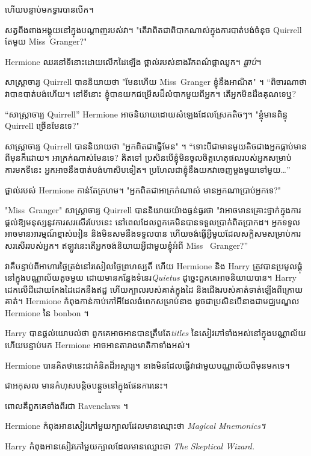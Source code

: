 ហើយបន្ទាប់មកទ្វារបានបើក។

សត្វពីងពាងអង្គុយនៅក្នុងបណ្តាញរបស់វា។ "តើវាពិតជាពិបាកណាស់ក្នុងការបាត់បង់ចំនុច Quirrell តែមួយ Miss~Granger?"

Hermione ឈរនៅទីនោះដោយលើកដៃឡើង ថ្ពាល់របស់នាងរីកពណ៌ផ្កាឈូក។ \emph{ធ្លាប់}។

សាស្រ្តាចារ្យ Quirrell បាននិយាយថា "មែនហើយ Miss~Granger ខ្ញុំនឹងអាណិត" ។ “ពិចារណា​ថា​វា​បាន​បាត់​បង់​ហើយ។ នៅទីនោះ ខ្ញុំបានយកជម្រើសដ៏លំបាកមួយពីអ្នក។ តើអ្នកមិនដឹងគុណទេឬ?

“សាស្រ្តាចារ្យ Quirrell” Hermione អាចនិយាយដោយសំឡេងដែលស្រែកតិចៗ។ "ខ្ញុំមានពិន្ទុ Quirrell ច្រើនមែនទេ?"

សាស្រ្តាចារ្យ Quirrell បាននិយាយថា "អ្នកពិតជាធ្វើមែន" ។ “ទោះបីជាមានមួយតិចជាងអ្នកធ្លាប់មានពីមុនក៏ដោយ។ អាក្រក់ណាស់មែនទេ? គិតទៅ ប្រសិនបើខ្ញុំមិនចូលចិត្តហេតុផលរបស់អ្នកសម្រាប់ការមកទីនេះ អ្នកអាចនឹងបាត់បង់ហាសិបទៀត។ ប្រហែល​ជា​ខ្ញុំ​នឹង​យក​វា​ចេញ​ម្តង​មួយ​ទៅ​មួយ…”

ថ្ពាល់របស់ Hermione កាន់តែក្រហម។ "អ្នកពិតជាអាក្រក់ណាស់ មានអ្នកណាប្រាប់អ្នកទេ?"

"Miss~Granger" សាស្ត្រាចារ្យ Quirrell បាននិយាយយ៉ាងធ្ងន់ធ្ងរថា "វាអាចមានគ្រោះថ្នាក់ក្នុងការផ្តល់ឱ្យមនុស្សនូវការសរសើរបែបនេះ នៅពេលដែលពួកគេមិនបានទទួលប្រាក់ពិតប្រាកដ។ អ្នកទទួលអាចមានអារម្មណ៍ខ្មាស់អៀន និងមិនសមនឹងទទួលបាន ហើយចង់ធ្វើអ្វីមួយដែលសក្តិសមសម្រាប់ការសរសើររបស់អ្នក។ ឥឡូវ​នេះ​តើ​អ្នក​ចង់​និយាយ​អ្វី​ជាមួយ​ខ្ញុំ​អំពី Miss ~Granger?”

\later

វាគឺបន្ទាប់ពីអាហារថ្ងៃត្រង់នៅរសៀលថ្ងៃព្រហស្បតិ៍ ហើយ Hermione និង Harry ត្រូវបានប្រមូលផ្តុំនៅក្នុងបណ្ណាល័យតូចមួយ ដោយមានកន្លែងទំនេរ\emph{Quietus} ដូច្នេះពួកគេអាចនិយាយបាន។ Harry ដេក​លើ​ដី​ដោយ​កែងដៃ​ដេក​នឹង​ឥដ្ឋ ហើយ​ក្បាល​របស់គាត់​ក្នុង​ដៃ និង​ជើង​របស់គាត់​ទាត់​ឡើង​ពីក្រោយ​គាត់។ Hermione កំពុងកាន់កាប់កៅអីដែលធំពេកសម្រាប់នាង ដូចជាប្រសិនបើនាងជាមជ្ឈមណ្ឌល Hermione នៃ bonbon ។

Harry បានផ្តល់យោបល់ថា ពួកគេអាចអានបានត្រឹមតែ\emph{titles} នៃសៀវភៅទាំងអស់នៅក្នុងបណ្ណាល័យ ហើយបន្ទាប់មក Hermione អាចអានតារាងមាតិកាទាំងអស់។

Hermione បានគិតថានេះជាគំនិតដ៏អស្ចារ្យ។ នាងមិនដែលធ្វើវាជាមួយបណ្ណាល័យពីមុនមកទេ។

ជាអកុសល មានកំហុសបន្តិចបន្តួចនៅក្នុងផែនការនេះ។

ពោលគឺពួកគេទាំងពីរជា Ravenclaws ។

Hermione កំពុងអានសៀវភៅមួយក្បាលដែលមានឈ្មោះថា \emph{Magical Mnemonics។}

Harry កំពុងអានសៀវភៅមួយក្បាលដែលមានឈ្មោះថា \emph{The Skeptical Wizard.}

